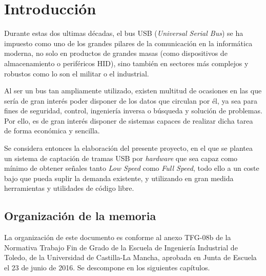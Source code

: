 \chapter{Introducción} 
\label{ch:introduccion}

Durante estas dos ultimas décadas, el bus USB\cite{specification2000revision} (\emph{Universal Serial Bus}) se ha impuesto como uno de los grandes pilares de la comunicación en la informática moderna, no solo en productos de grandes masas (como dispositivos de almacenamiento o periféricos HID\cite{usb:hid}), sino también en sectores más complejos y robustos como lo son el militar o el industrial.

Al ser un bus tan ampliamente utilizado, existen multitud de ocasiones en las que sería de gran interés poder disponer de los datos que circulan por él, ya sea para fines de seguridad\cite{NISSIM2017675}, control, ingeniería inversa o búsqueda y solución de problemas. Por ello, es de gran interés disponer de sistemas capaces de realizar dicha tarea de forma económica y sencilla.

Se considera entonces la elaboración del presente proyecto, en el que se plantea un sistema de captación de tramas USB por \textit{hardware} que sea capaz como mínimo de obtener señales tanto \textit{Low Speed} como \textit{Full Speed}, todo ello a un coste bajo que pueda suplir la demanda existente, y utilizando en gran medida herramientas y utilidades de código libre.

\section{Organización de la memoria} 
La organización de este documento es conforme al anexo TFG-08b\cite{tfg08b} de la Normativa Trabajo Fin de Grado de la Escuela de Ingeniería Industrial de Toledo, de la Universidad de Castilla-La Mancha, aprobada en Junta de Escuela el 23 de junio de 2016. Se descompone en los siguientes capítulos.

